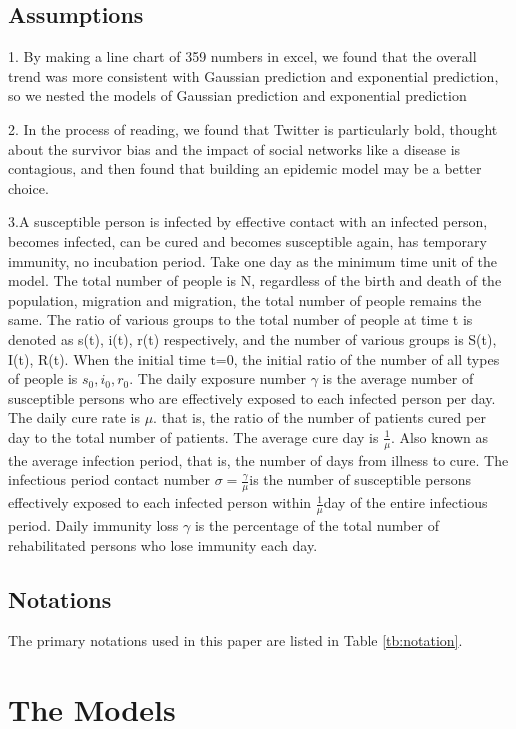 \documentclass[12pt]{article}  %
\begin{document}
\subsection{Assumptions}
1. By making a line chart of 359 numbers in excel, we found that the overall trend was more consistent with Gaussian prediction and exponential prediction, so we nested the models of Gaussian prediction and exponential prediction

2. In the process of reading, we found that Twitter is particularly bold, thought about the survivor bias and the impact of social networks like a disease is contagious, and then found that building an epidemic model may be a better choice.

3.A susceptible person is infected by effective contact with an infected person, becomes infected, can be cured and becomes susceptible again, has temporary immunity, no incubation period. Take one day as the minimum time unit of the model. The total number of people is N, regardless of the birth and death of the population, migration and migration, the total number of people remains the same. The ratio of various groups to the total number of people at time t is denoted as s(t), i(t), r(t) respectively, and the number of various groups is S(t), I(t), R(t). When the initial time t=0, the initial ratio of the number of all types of people is $s_0, i_0, r_0$. The daily exposure number $\gamma$ is the average number of susceptible persons who are effectively exposed to each infected person per day. The daily cure rate is $\mu$. that is, the ratio of the number of patients cured per day to the total number of patients. The average cure day is $\frac{1}{\mu}$. Also known as the average infection period, that is, the number of days from illness to cure. The infectious period contact number $\sigma=\frac{\gamma}{\mu}$is the number of susceptible persons effectively exposed to each infected person within $\frac{1}{\mu}$day of the entire infectious period. Daily immunity loss $\gamma$ is the percentage of the total number of rehabilitated persons who lose immunity each day.

\subsection{Notations}
The primary notations used in this paper are listed in Table \ref{tb:notation}.



\section{The Models}
\end{document}
